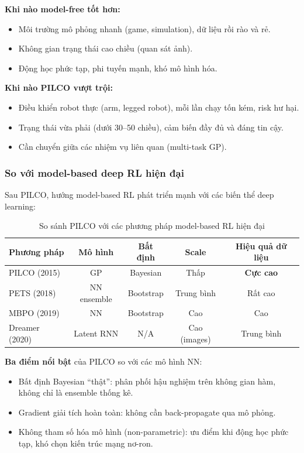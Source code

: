 \textbf{Khi nào model-free tốt hơn:}
\begin{itemize}
    \item Môi trường mô phỏng nhanh (game, simulation), dữ liệu rồi rào và rẻ.
    \item Không gian trạng thái cao chiều (quan sát ảnh).
    \item Động học phức tạp, phi tuyến mạnh, khó mô hình hóa.
\end{itemize}

\textbf{Khi nào PILCO vượt trội:}
\begin{itemize}
    \item Điều khiển robot thực (arm, legged robot), mỗi lần chạy tốn kém, risk hư hại.
    \item Trạng thái vừa phải (dưới 30--50 chiều), cảm biến đầy đủ và đáng tin cậy.
    \item Cần chuyển giữa các nhiệm vụ liên quan (multi-task GP).
\end{itemize}

\subsubsection{So với model-based deep RL hiện đại}
\label{SUB_SUB_SEC_vs_modern_mbrl}

Sau PILCO, hướng model-based RL phát triển mạnh với các biến thể deep learning:

\begin{table}[H]
\centering
\caption{So sánh PILCO với các phương pháp model-based RL hiện đại}
\label{TAB_mbrl_comparison}
\begin{tabular}{|l|c|c|c|c|}
\hline
\textbf{Phương pháp} & \textbf{Mô hình} & \textbf{Bất định} & \textbf{Scale} & \textbf{Hiệu quả dữ liệu} \\
\hline
PILCO (2015) & GP & Bayesian & Thấp & \textbf{Cực cao} \\
PETS (2018) & NN ensemble & Bootstrap & Trung bình & Rất cao \\
MBPO (2019) & NN & Bootstrap & Cao & Cao \\
Dreamer (2020) & Latent RNN & N/A & Cao (images) & Trung bình \\
\hline
\end{tabular}
\end{table}

\textbf{Ba điểm nổi bật} của PILCO so với các mô hình NN:
\begin{itemize}
    \item Bất định Bayesian ``thật'': phân phối hậu nghiệm trên không gian hàm, không chỉ là ensemble thống kê.
    \item Gradient giải tích hoàn toàn: không cần back-propagate qua mô phỏng.
    \item Không tham số hóa mô hình (non-parametric): ưu điểm khi động học phức tạp, khó chọn kiến trúc mạng nơ-ron.
\end{itemize}

